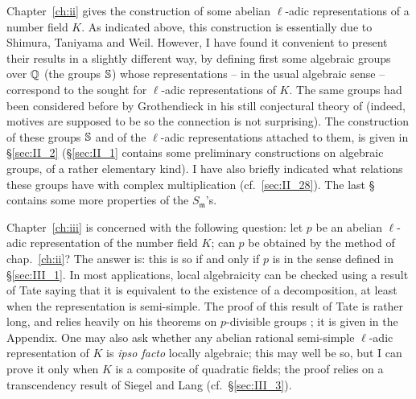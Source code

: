 Chapter~\ref{ch:ii} gives the construction of some abelian $\ell$-adic
representations of a number field $K$. As indicated above, this construction is
essentially due to Shimura, Taniyama and Weil. However, I have found it
convenient to present their results in a slightly different way, by defining
first some algebraic groups over $\mathbb{Q}$ (the groups $\mathbb{S}$) whose representations
-- in the usual algebraic sense -- correspond to the sought for $\ell$-adic
representations of $K$.  The same groups had been considered before by
Grothendieck in his still conjectural theory of  (indeed,
motives are supposed to be  so
the connection is not surprising). The construction of these groups $\mathbb{S}$ and
of the $\ell$-adic representations attached to them, is given in
\S\ref{sec:II_2} (\S\ref{sec:II_1} contains some preliminary constructions on
algebraic groups, of a rather elementary kind). I have also briefly indicated
what relations these groups have with complex multiplication (cf.\
\ref{sec:II_28}). The last \S{} contains some more properties of the
$S_{\mathfrak{m}}$'s.

Chapter~\ref{ch:iii} is concerned with the following question: let $p$ be an
abelian $\ell$-adic representation of the number field $K$; can $p$ be obtained
by the method of chap.~\ref{ch:ii}?  The answer is: this is so if and only if
$p$ is \emph{\textquote{locally algebraic}} in the sense defined in
\S\ref{sec:III_1}.  In most applications, local algebraicity can be checked
using a result of Tate saying that it is equivalent to the existence of a
\textquote{Hodge-Tate} decomposition, at least when the representation is
semi-simple. The proof of this result of Tate is rather long, and relies
heavily on his theorems on $p$-divisible groups \cite{39}; it is given in the
Appendix.  One may also ask whether any abelian rational semi-simple
$\ell$-adic representation of $K$ is \emph{ipso facto} locally algebraic; this
may well be so, but I can prove it only when $K$ is a composite of quadratic
fields; the proof relies on a transcendency result of Siegel and Lang (cf.\
\S\ref{sec:III_3}).

